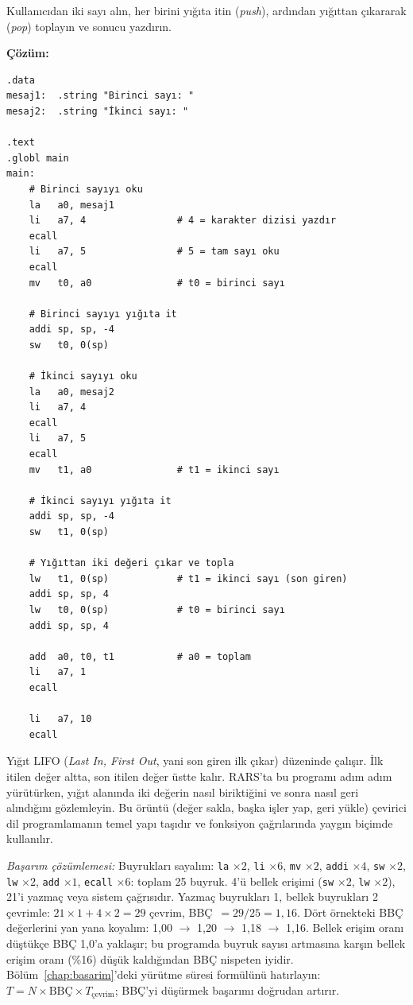 \begin{ornek}[4.4]
\label{orn:yigit-toplama}
Kullanıcıdan iki sayı alın, her birini yığıta itin (\emph{push}), ardından yığıttan çıkararak (\emph{pop}) toplayın ve sonucu yazdırın.

\textbf{Çözüm:}

\begin{lstlisting}[style=riscv]
.data
mesaj1:  .string "Birinci sayı: "
mesaj2:  .string "İkinci sayı: "

.text
.globl main
main:
    # Birinci sayıyı oku
    la   a0, mesaj1
    li   a7, 4                # 4 = karakter dizisi yazdır
    ecall
    li   a7, 5                # 5 = tam sayı oku
    ecall
    mv   t0, a0               # t0 = birinci sayı

    # Birinci sayıyı yığıta it
    addi sp, sp, -4
    sw   t0, 0(sp)

    # İkinci sayıyı oku
    la   a0, mesaj2
    li   a7, 4
    ecall
    li   a7, 5
    ecall
    mv   t1, a0               # t1 = ikinci sayı

    # İkinci sayıyı yığıta it
    addi sp, sp, -4
    sw   t1, 0(sp)

    # Yığıttan iki değeri çıkar ve topla
    lw   t1, 0(sp)            # t1 = ikinci sayı (son giren)
    addi sp, sp, 4
    lw   t0, 0(sp)            # t0 = birinci sayı
    addi sp, sp, 4

    add  a0, t0, t1           # a0 = toplam
    li   a7, 1
    ecall

    li   a7, 10
    ecall
\end{lstlisting}

Yığıt LIFO (\emph{Last In, First Out}, yani son giren ilk çıkar) düzeninde çalışır. İlk itilen değer altta, son itilen değer üstte kalır. RARS'ta bu programı adım adım yürütürken, yığıt alanında iki değerin nasıl biriktiğini ve sonra nasıl geri alındığını gözlemleyin. Bu örüntü (değer sakla, başka işler yap, geri yükle) çevirici dil programlamanın temel yapı taşıdır ve fonksiyon çağrılarında yaygın biçimde kullanılır.

\emph{Başarım çözümlemesi:} Buyrukları sayalım: \texttt{la} $\times 2$, \texttt{li} $\times 6$, \texttt{mv} $\times 2$, \texttt{addi} $\times 4$, \texttt{sw} $\times 2$, \texttt{lw} $\times 2$, \texttt{add} $\times 1$, \texttt{ecall} $\times 6$: toplam 25 buyruk. 4'ü bellek erişimi (\texttt{sw} $\times 2$, \texttt{lw} $\times 2$), 21'i yazmaç veya sistem çağrısıdır. Yazmaç buyrukları 1, bellek buyrukları 2 çevrimle: $21 \times 1 + 4 \times 2 = 29$ çevrim, BBÇ~$= 29/25 = 1{,}16$. Dört örnekteki BBÇ değerlerini yan yana koyalım: 1{,}00 $\rightarrow$ 1{,}20 $\rightarrow$ 1{,}18 $\rightarrow$ 1{,}16. Bellek erişim oranı düştükçe BBÇ 1{,}0'a yaklaşır; bu programda buyruk sayısı artmasına karşın bellek erişim oranı (\%16) düşük kaldığından BBÇ nispeten iyidir. Bölüm~\ref{chap:basarim}'deki yürütme süresi formülünü hatırlayın: $T = N \times \text{BBÇ} \times T_{\text{çevrim}}$; BBÇ'yi düşürmek başarımı doğrudan artırır.
\end{ornek}

